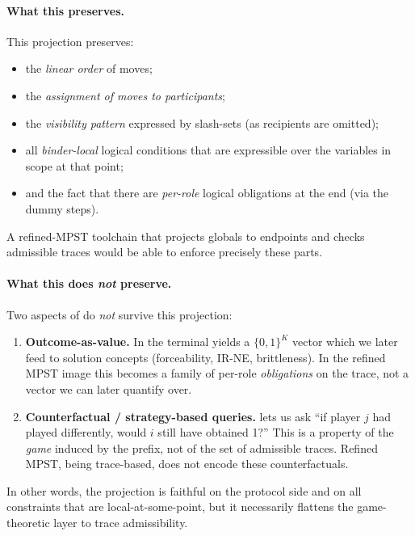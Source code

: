 \paragraph{What this preserves.}
This projection preserves:
\begin{itemize}[nosep]
  \item the \emph{linear order} of moves;
  \item the \emph{assignment of moves to participants};
  \item the \emph{visibility pattern} expressed by slash-sets (as recipients are
        omitted);
  \item all \emph{binder-local} logical conditions that are expressible over the
        variables in scope at that point;
  \item and the fact that there are \emph{per-role} logical obligations at the
        end (via the dummy steps).
\end{itemize}
A refined-MPST toolchain that projects globals to endpoints and checks
admissible traces would be able to enforce precisely these parts.

\paragraph{What this does \emph{not} preserve.}
Two aspects of \KFOL{} do \emph{not} survive this projection:

\begin{enumerate}[nosep]
  \item \textbf{Outcome-as-value.} In \KFOL{} the terminal yields a
        \(\{0,1\}^K\) vector which we later feed to solution concepts (forceability,
        IR-NE, brittleness). In the refined MPST image this becomes a family of
        per-role \emph{obligations} on the trace, not a vector we can later
        quantify over.

  \item \textbf{Counterfactual / strategy-based queries.} \KFOL{} lets us ask
        “if player \(j\) had played differently, would \(i\) still have obtained
        1?” This is a property of the \emph{game} induced by the prefix, not of
        the set of admissible traces. Refined MPST, being trace-based, does not
        encode these counterfactuals.
\end{enumerate}

In other words, the projection is faithful on the protocol side and on all
constraints that are local-at-some-point, but it necessarily flattens the
game-theoretic layer to trace admissibility.

